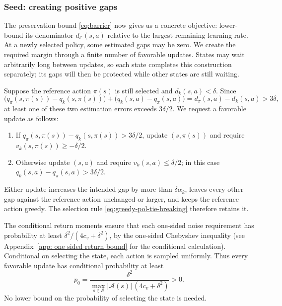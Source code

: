 \subsubsection{Seed: creating positive gaps}
The preservation bound \eqref{eq:barrier} now gives us a concrete objective: lower-bound its denominator $d_{t'}(s,a)$ relative to the largest remaining learning rate. At a newly selected policy, some estimated gaps may be zero. We create the required margin through a finite number of favorable updates. States may wait arbitrarily long between updates, so each state completes this construction separately; its gaps will then be protected while other states are still waiting.

Suppose the reference action $\pi(s)$ is still selected and $d_k(s,a)<\delta$. Since
\[
\big(q_\pi(s,\pi(s))-q_k(s,\pi(s))\big)
+\big(q_k(s,a)-q_\pi(s,a)\big)
=d_\pi(s,a)-d_k(s,a)>3\delta,
\]
at least one of these two estimation errors exceeds $3\delta/2$. We request a favorable update as follows:
\begin{enumerate}
\item If $q_\pi(s,\pi(s))-q_k(s,\pi(s))>3\delta/2$, update $(s,\pi(s))$ and require $v_k(s,\pi(s))\ge-\delta/2$.
\item Otherwise update $(s,a)$ and require $v_k(s,a)\le\delta/2$; in this case $q_k(s,a)-q_\pi(s,a)>3\delta/2$.
\end{enumerate}
Either update increases the intended gap by more than $\delta\alpha_k$, leaves every other gap against the reference action unchanged or larger, and keeps the reference action greedy. The selection rule \eqref{eq:greedy-pol-tie-breaking} therefore retains it.

The conditional return moments ensure that each one-sided noise requirement has probability at least $\delta^2/(4c_v+\delta^2)$, by the one-sided Chebyshev inequality (see Appendix~\ref{app: one sided return bound} for the conditional calculation). Conditional on selecting the state, each action is sampled uniformly. Thus every favorable update has conditional probability at least
\begin{equation}
\label{eq:localprob}
p_0=\frac{\delta^2}{\max_{s\in\mathcal S}|\mathcal A(s)|\,(4c_v+\delta^2)}>0.
\end{equation}
No lower bound on the probability of selecting the state is needed.

